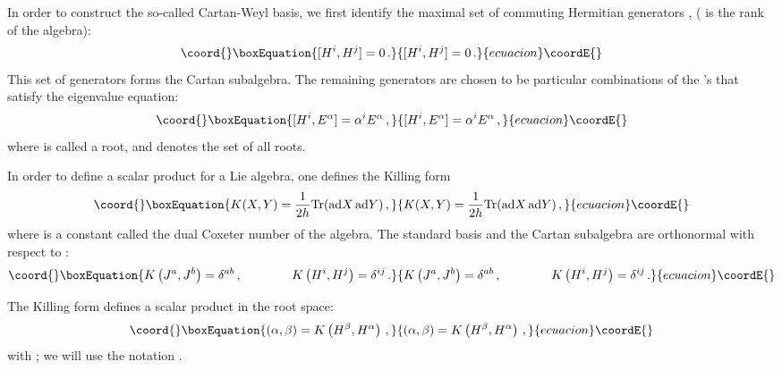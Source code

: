 \documentclass[a4paper,12pt]{report}
\begin{document}
In order to construct the so-called Cartan-Weyl basis, we first identify the maximal set of commuting Hermitian
generators \coordHE{}, \coordHE{} (\coordHE{} is the rank of the algebra):
\begin{equation}\coord{}\boxEquation{
[H^{i},H^{j}]=0\,.
}{
[H^{i},H^{j}]=0\,.
}{ecuacion}\coordE{}\end{equation}
This set of generators forms the Cartan subalgebra. The remaining generators are chosen to be particular
combinations of the \coordHE{}'s that satisfy the eigenvalue equation:
\begin{equation}\coord{}\boxEquation{\label{root}
[H^{i},E^{\alpha}]=\alpha^{i}E^{\alpha}\,,
}{[H^{i},E^{\alpha}]=\alpha^{i}E^{\alpha}\,,
}{ecuacion}\coordE{}\end{equation}
where \coordHE{} is called a root, and \myHighlight{$\Delta$}\coordHE{} denotes the set of all roots.

In order to define a scalar product for a Lie algebra, one defines the Killing form
\begin{equation}\coord{}\boxEquation{
K(X,Y)=\frac{1}{2h}\textrm{Tr}(\textrm{ad}X\,\textrm{ad}Y)\,,
}{
K(X,Y)=\frac{1}{2h}\textrm{Tr}(\textrm{ad}X\,\textrm{ad}Y)\,,
}{ecuacion}\coordE{}\end{equation}
where \coordHE{} is a constant called the dual Coxeter number of the algebra. The standard basis \coordHE{}
and the Cartan subalgebra are orthonormal with respect to \coordHE{}:
\begin{equation}\coord{}\boxEquation{
K\left(J^{a},J^{b}\right)=\delta^{ab}\,, \qquad\qquad K\left(H^{i},H^{j}\right)=\delta^{ij}\,.
}{
K\left(J^{a},J^{b}\right)=\delta^{ab}\,, \qquad\qquad K\left(H^{i},H^{j}\right)=\delta^{ij}\,.
}{ecuacion}\coordE{}\end{equation}


The Killing form defines a scalar product in the root space:
\begin{equation}\coord{}\boxEquation{
\left(\alpha,\beta\right)=K\left(H^{\beta},H^{\alpha}\right)\,,
}{
\left(\alpha,\beta\right)=K\left(H^{\beta},H^{\alpha}\right)\,,
}{ecuacion}\coordE{}\end{equation}
with \coordHE{}; we will use the notation
\coordHE{}.
\end{document}
